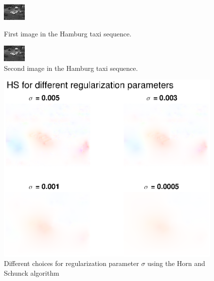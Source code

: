 \documentclass[10pt,a4paper]{article}
\begin{document}
\begin{figure}
\centering
\begin{minipage}{0.45\textwidth}
\centering
\includegraphics[scale=9]{taxi-00}
\caption{First image in the Hamburg taxi sequence.}
\label{taxi1}
\end{minipage}\hfill
\begin{minipage}{0.45\textwidth}
\centering
\includegraphics[scale=9]{taxi-01}
\caption{Second image in the Hamburg taxi sequence.}
\label{taxi2}
\end{minipage}
\end{figure}

\begin{figure}
    \centering
    \includegraphics[scale=0.8]{regularizationHS}
    \caption{Different choices for regularization parameter $\sigma$ using the Horn and Schunck algorithm}
    \label{reguHS}
\end{figure}
\end{document}
